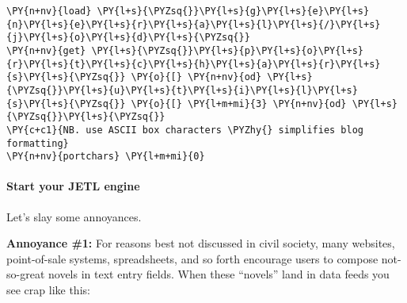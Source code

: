     \begin{tcolorbox}[breakable, size=fbox, boxrule=1pt, pad at break*=1mm,colback=cellbackground, colframe=cellborder]
\begin{Verbatim}[commandchars=\\\{\}]
\PY{n+nv}{load} \PY{l+s}{\PYZsq{}}\PY{l+s}{g}\PY{l+s}{e}\PY{l+s}{n}\PY{l+s}{e}\PY{l+s}{r}\PY{l+s}{a}\PY{l+s}{l}\PY{l+s}{/}\PY{l+s}{j}\PY{l+s}{o}\PY{l+s}{d}\PY{l+s}{\PYZsq{}}
\PY{n+nv}{get} \PY{l+s}{\PYZsq{}}\PY{l+s}{p}\PY{l+s}{o}\PY{l+s}{r}\PY{l+s}{t}\PY{l+s}{c}\PY{l+s}{h}\PY{l+s}{a}\PY{l+s}{r}\PY{l+s}{s}\PY{l+s}{\PYZsq{}} \PY{o}{[} \PY{n+nv}{od} \PY{l+s}{\PYZsq{}}\PY{l+s}{u}\PY{l+s}{t}\PY{l+s}{i}\PY{l+s}{l}\PY{l+s}{s}\PY{l+s}{\PYZsq{}} \PY{o}{[} \PY{l+m+mi}{3} \PY{n+nv}{od} \PY{l+s}{\PYZsq{}}\PY{l+s}{\PYZsq{}}
\PY{c+c1}{NB. use ASCII box characters \PYZhy{} simplifies blog formatting}
\PY{n+nv}{portchars} \PY{l+m+mi}{0}
\end{Verbatim}
\end{tcolorbox}


    \hypertarget{start-your-jetl-engine}{%
\paragraph{Start your JETL engine}\label{start-your-jetl-engine}}

    Let's slay some annoyances.

\textbf{Annoyance \#1:} For reasons best not discussed in civil society,
many websites, point-of-sale systems, spreadsheets, and so forth
encourage users to compose not-so-great novels in text entry fields.
When these ``novels'' land in data feeds you see crap like this:

